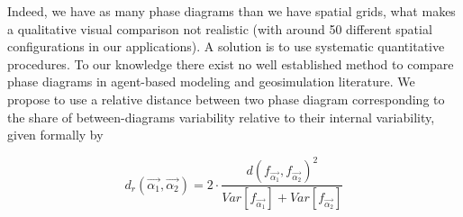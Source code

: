 \documentclass[Royal,sageh,times]{sagej}
\begin{document}
Indeed, we have as many phase diagrams than we have spatial grids, what makes a qualitative visual comparison not realistic (with around 50 different spatial configurations in our applications). A solution is to use systematic quantitative procedures. To our knowledge there exist no well established method to compare phase diagrams in agent-based modeling and geosimulation literature. We propose to use a relative distance between two phase diagram corresponding to the share of between-diagrams variability relative to their internal variability, given formally by



\begin{equation}\label{eq:phase-distance}
d_r\left(\vec{\alpha_1},\vec{\alpha_2}\right) = 2 \cdot \frac{d(f_{\vec{\alpha_1}},f_{\vec{\alpha_2}})^2}{Var\left[f_{\vec{\alpha_1}}\right] + Var\left[f_{\vec{\alpha_2}}\right]}
\end{equation}
\end{document}
